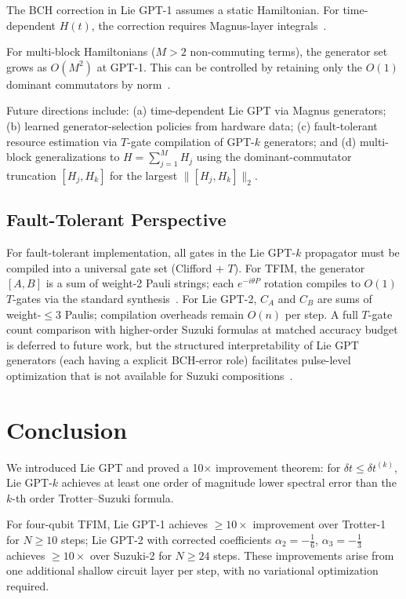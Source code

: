 \documentclass[aps,prxquantum,twocolumn,nofootinbib]{revtex4-2}
\begin{document}
The BCH correction in Lie GPT-1 assumes a static Hamiltonian. For
time-dependent $H(t)$, the correction requires Magnus-layer
integrals~\cite{sharma2024,fang2025,tran2021,su2021,liang2026}.

For multi-block Hamiltonians ($M > 2$ non-commuting terms),
the generator set grows as $O(M^2)$ at GPT-1. This can be
controlled by retaining only the $O(1)$ dominant commutators
by norm~\cite{zhuk2023,layden2022}.

Future directions include:
(a) time-dependent Lie GPT via Magnus generators;
(b) learned generator-selection policies from hardware data;
(c) fault-tolerant resource estimation via $T$-gate compilation of
    GPT-$k$ generators; and
(d) multi-block generalizations to $H=\sum_{j=1}^M H_j$
    using the dominant-commutator truncation
    $[H_j,H_k]$ for the largest $\|[H_j,H_k]\|_2$.

\subsection{Fault-Tolerant Perspective}

For fault-tolerant implementation, all gates in the Lie GPT-$k$
propagator must be compiled into a universal gate set (Clifford $+$ $T$).
For TFIM, the generator $[A,B]$ is a sum of weight-2 Pauli strings;
each $e^{-i\theta P}$ rotation compiles to $O(1)$ $T$-gates via
the standard synthesis~\cite{childs2022,berry2024,su2021}.
For Lie GPT-2, $C_A$ and $C_B$ are sums of weight-$\leq 3$ Paulis;
compilation overheads remain $O(n)$ per step.
A full $T$-gate count comparison with higher-order Suzuki formulas
at matched accuracy budget is deferred to future work, but the
structured interpretability of Lie GPT generators (each having a
explicit BCH-error role) facilitates pulse-level optimization that
is not available for Suzuki compositions~\cite{babbush2022,haah2021}.

\section{Conclusion}
\label{sec:conclusion}

We introduced Lie GPT and proved a 10$\times$ improvement theorem:
for $\delta t \leq \delta t^{(k)}$, Lie GPT-$k$ achieves at least
one order of magnitude lower spectral error than the $k$-th order
Trotter--Suzuki formula.

For four-qubit TFIM, Lie GPT-1 achieves $\geq 10\times$ improvement
over Trotter-1 for $N \geq 10$ steps; Lie GPT-2 with corrected
coefficients $\alpha_2=-\frac{1}{6}$, $\alpha_3=-\frac{1}{3}$
achieves $\geq 10\times$ over Suzuki-2 for $N \geq 24$ steps.
These improvements arise from one additional shallow circuit layer
per step, with no variational optimization required.
\end{document}
